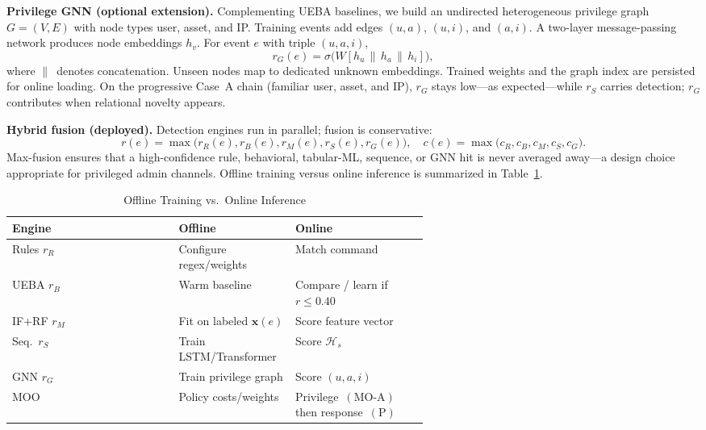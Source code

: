 \textbf{Privilege GNN (optional extension).}
Complementing UEBA baselines, we build an undirected heterogeneous privilege graph $G=(V,E)$ with node types user, asset, and IP. Training events add edges $(u,a)$, $(u,i)$, and $(a,i)$. A two-layer message-passing network produces node embeddings $h_v$. For event $e$ with triple $(u,a,i)$,
\begin{equation}
r_G(e)=\sigma\!\bigl(W[h_u\,\|\,h_a\,\|\,h_i]\bigr),
\tag{3.5}
\end{equation}
where $\|\,$ denotes concatenation. Unseen nodes map to dedicated unknown embeddings. Trained weights and the graph index are persisted for online loading. On the progressive Case~A chain (familiar user, asset, and IP), $r_G$ stays low---as expected---while $r_S$ carries detection; $r_G$ contributes when relational novelty appears.

\textbf{Hybrid fusion (deployed).} Detection engines run in parallel; fusion is conservative:
\begin{equation}
r(e)=\max\bigl(r_R(e),r_B(e),r_M(e),r_S(e),r_G(e)\bigr), \quad
c(e)=\max\bigl(c_R,c_B,c_M,c_S,c_G\bigr).
\tag{4}
\end{equation}
Max-fusion ensures that a high-confidence rule, behavioral, tabular-ML, sequence, or GNN hit is never averaged away---a design choice appropriate for privileged admin channels. Offline training versus online inference is summarized in Table~\ref{art-tab:train-infer}.

\begin{table}[H]
\caption{Offline Training vs.\ Online Inference}
\label{art-tab:train-infer}
\centering
\scriptsize
\begin{tabular}{@{}l p{0.28\linewidth} p{0.32\linewidth}@{}}
\toprule
\textbf{Engine} & \textbf{Offline} & \textbf{Online} \\
\midrule
Rules $r_R$ & Configure regex/weights & Match command \\
UEBA $r_B$ & Warm baseline & Compare / learn if $r\leq 0.40$ \\
IF+RF $r_M$ & Fit on labeled $\mathbf{x}(e)$ & Score feature vector \\
Seq.\ $r_S$ & Train LSTM/Transformer & Score $\mathcal{H}_s$ \\
GNN $r_G$ & Train privilege graph & Score $(u,a,i)$ \\
MOO & Policy costs/weights & Privilege~$(\mathrm{MO}\text{-}\mathrm{A})$ then response~$(\mathrm{P})$ \\
\bottomrule
\end{tabular}
\end{table}

